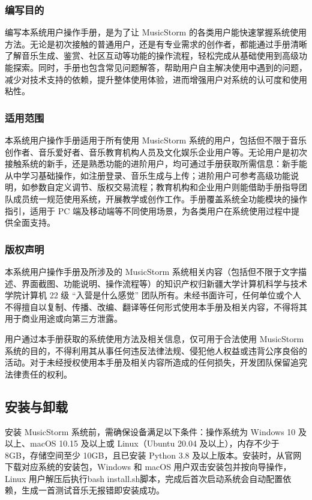 \documentclass{base}
\numberwithin{figure}{section} %
\begin{document}
\subsubsection{编写目的}

编写本系统用户操作手册，是为了让 MusicStorm 的各类用户能快速掌握系统使用方法。无论是初次接触的普通用户，还是有专业需求的创作者，都能通过手册清晰了解音乐生成、鉴赏、社区互动等功能的操作流程，轻松完成从基础使用到高级功能探索。同时，手册也包含常见问题解答，帮助用户自主解决使用中遇到的问题，减少对技术支持的依赖，提升整体使用体验，进而增强用户对系统的认可度和使用粘性。

\subsubsection{适用范围}

本系统用户操作手册适用于所有使用 MusicStorm 系统的用户，包括但不限于音乐创作者、音乐爱好者、音乐教育机构人员及文化娱乐企业用户等。无论用户是初次接触系统的新手，还是熟悉功能的进阶用户，均可通过手册获取所需信息：新手能从中学习基础操作，如注册登录、音乐生成与上传；进阶用户可参考高级功能说明，如参数自定义调节、版权交易流程；教育机构和企业用户则能借助手册指导团队成员统一规范使用系统，开展教学或创作工作。手册覆盖系统全功能模块的操作指引，适用于 PC 端及移动端等不同使用场景，为各类用户在系统使用过程中提供全面支持。

\subsubsection{版权声明}

本系统用户操作手册及所涉及的 MusicStorm 系统相关内容（包括但不限于文字描述、界面截图、功能说明、操作流程等）的知识产权归新疆大学计算机科学与技术学院计算机 22 级 “入营是什么感觉” 团队所有。未经书面许可，任何单位或个人不得擅自以复制、传播、改编、翻译等任何形式使用本手册及相关内容，不得将其用于商业用途或向第三方泄露。

用户通过本手册获取的系统使用方法及相关信息，仅可用于合法使用 MusicStorm 系统的目的，不得利用其从事任何违反法律法规、侵犯他人权益或违背公序良俗的活动。对于未经授权使用本手册及相关内容所造成的任何损失，开发团队保留追究法律责任的权利。

\subsection{安装与卸载}

安装 MusicStorm 系统前，需确保设备满足以下条件：操作系统为 Windows 10 及以上、macOS 10.15 及以上或 Linux（Ubuntu 20.04 及以上），内存不少于 8GB，存储空间至少 10GB，且已安装 Python 3.8 及以上版本。安装时，从官网下载对应系统的安装包，Windows 和 macOS 用户双击安装包并按向导操作，Linux 用户解压后执行bash install.sh脚本，完成后首次启动系统会自动配置依赖，生成一首测试音乐无报错即安装成功。
\end{document}
